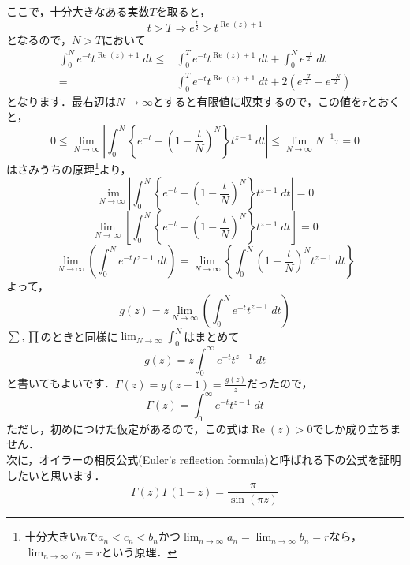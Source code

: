 \documentclass[./main]{subfile}
\begin{document}
ここで，十分大きなある実数$T$を取ると，
\[
t>T\Rightarrow e^{\frac{t}{2}}>t^{\operatorname{Re}(z)+1}
\]
となるので，$N>T$において
\begin{align*}
\int_0^Ne^{-t}t^{\operatorname{Re}(z)+1}\;dt\leq&\int_0^Te^{-t}t^{\operatorname{Re}(z)+1}\;dt+\int_0^Ne^{\frac{-t}{2}}\;dt\\
=&\int_0^Te^{-t}t^{\operatorname{Re}(z)+1}\;dt+2(e^{\frac{-T}{2}}-e^{\frac{-N}{2}})
\end{align*}
となります．最右辺は$N\to\infty$とすると有限値に収束するので，この値を$\tau$とおくと，
\[
0\leq\lim_{N\to\infty}\left|\int_0^N\left\{e^{-t}-\left(1-\frac{t}{N}\right)^N\right\}t^{z-1}\;dt\right|\leq\lim_{N\to\infty}N^{-1}\tau=0
\]
はさみうちの原理\footnote{十分大きい$n$で$a_n<c_n<b_n$かつ$\lim_{n\to\infty}a_n=\lim_{n\to\infty}b_n=r$なら，$\lim_{n\to\infty}c_n=r$という原理．}より，
\[
\lim_{N\to\infty}\left|\int_0^N\left\{e^{-t}-\left(1-\frac{t}{N}\right)^N\right\}t^{z-1}\;dt\right|=0
\]
\[
\lim_{N\to\infty}\left[\int_0^N\left\{e^{-t}-\left(1-\frac{t}{N}\right)^N\right\}t^{z-1}\;dt\right]=0
\]
\[
\lim_{N\to\infty}\left(\int_0^Ne^{-t}t^{z-1}\;dt\right)=\lim_{N\to\infty}\left\{\int_0^N\left(1-\frac{t}{N}\right)^Nt^{z-1}\;dt\right\}
\]
よって，
\[
g(z)=z\lim_{N\to\infty}\left(\int_0^Ne^{-t}t^{z-1}\;dt\right)
\]
$\sum,\prod$のときと同様に$\lim_{N\to\infty}\int_0^N$はまとめて
\[
g(z)=z\int_0^{\infty}e^{-t}t^{z-1}\;dt
\]
と書いてもよいです．$\Gamma(z)=g(z-1)=\frac{g(z)}{z}$だったので，
\[
\Gamma(z)=\int_0^{\infty}e^{-t}t^{z-1}\;dt
\]
ただし，初めにつけた仮定があるので，この式は$\operatorname{Re}(z)>0$でしか成り立ちません．
\vspace{\baselineskip}\\

次に，オイラーの相反公式(Euler's reflection formula)と呼ばれる下の公式を証明したいと思います．
\begin{equation}\label{ERF}
\Gamma(z)\Gamma(1-z)=\frac{\pi}{\sin (\pi z)}
\end{equation}
\end{document}

